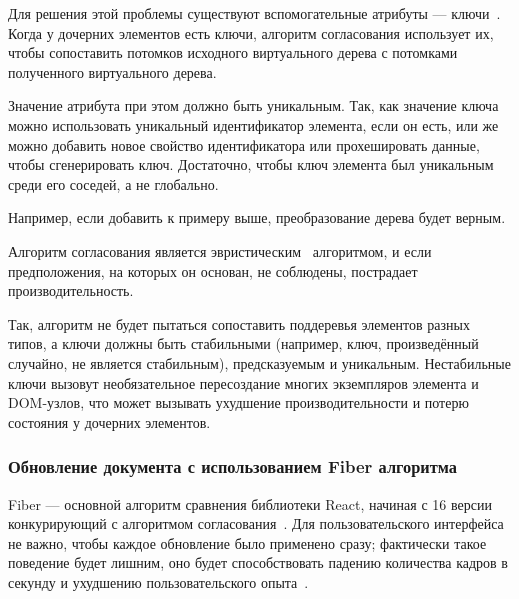 Для решения этой проблемы существуют вспомогательные атрибуты  --- ключи~\cite{keys}. Когда у дочерних элементов есть ключи, алгоритм согласования использует их, чтобы сопоставить потомков исходного виртуального дерева с потомками полученного виртуального дерева.

Значение атрибута  при этом должно быть уникальным.
Так, как значение ключа  можно использовать уникальный идентификатор элемента, если он есть, или же можно добавить новое свойство идентификатора или прохешировать данные, чтобы сгенерировать ключ.
Достаточно, чтобы ключ элемента был уникальным среди его соседей, а не глобально.

Например, если добавить  к примеру выше, преобразование дерева будет верным.
\newline


Алгоритм согласования является эвристическим~\cite{euristic} алгоритмом, и если предположения, на которых он основан, не соблюдены, пострадает производительность.

Так, алгоритм не будет пытаться сопоставить поддеревья элементов разных типов, а ключи должны быть стабильными (например, ключ, произведённый случайно, не является стабильным), предсказуемым и уникальным.
Нестабильные ключи вызовут необязательное пересоздание многих экземпляров элемента и DOM-узлов, что может вызывать ухудшение производительности и потерю состояния у дочерних элементов.


\subsubsection{Обновление документа с использованием Fiber алгоритма}

Fiber --- основной алгоритм сравнения библиотеки React, начиная с 16 версии конкурирующий с алгоритмом согласования~\cite{fiber}. Для пользовательского интерфейса не важно, чтобы каждое обновление было применено сразу; фактически такое поведение будет лишним, оно будет способствовать падению количества кадров в секунду и ухудшению пользовательского опыта~\cite{react-dive}. 

